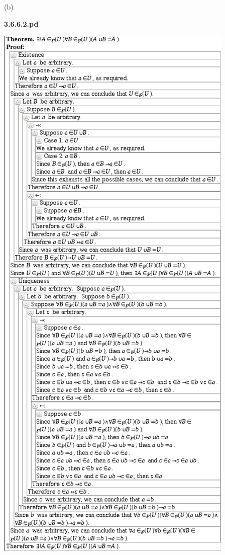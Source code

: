 \documentclass{article}
\begin{document}
\vspace{30pt}

(b)

\textbf{3.6.6.2.pd}
\vspace{10pt}

\includegraphics[scale=0.10]{3_6_6_2}
\end{document}
